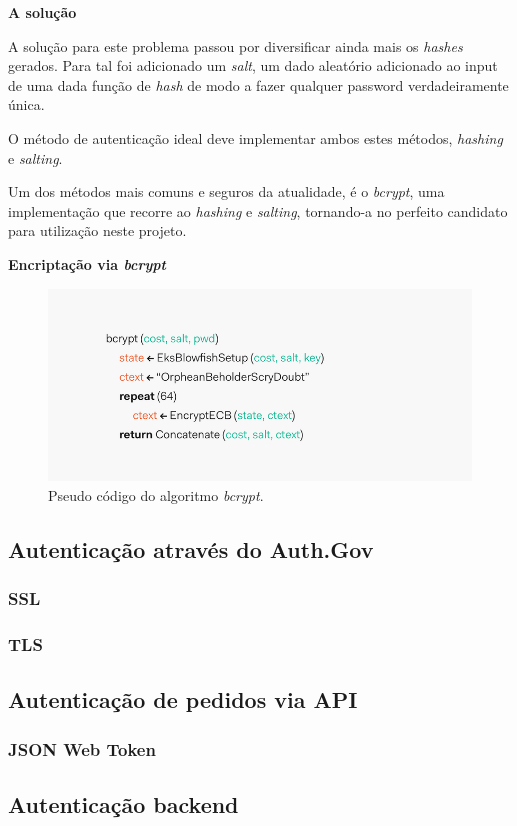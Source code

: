 \cleardoublepage
\large{\textbf{A solução}}


A solução para este problema passou por diversificar ainda mais os \emph{hashes} gerados. Para tal foi adicionado um \emph{salt}, um dado aleatório adicionado ao input de uma dada função de \emph{hash} de modo a fazer qualquer password verdadeiramente única.

O método de autenticação ideal deve implementar ambos estes métodos, \emph{hashing} e \emph{salting}.

Um dos métodos mais comuns e seguros da atualidade, é o \emph{bcrypt}, uma implementação que recorre ao \emph{hashing} e \emph{salting}, tornando-a no perfeito candidato para utilização neste projeto.

\vspace{0.5cm}
\large{\textbf{Encriptação via \emph{bcrypt}}}

\cleardoublepage

\begin{figure}[h]
    \centering
    \includegraphics[width=1\textwidth]{img/bcrypt/bcrypt-algo.png}
    \caption{Pseudo código do algoritmo \emph{bcrypt}.}
\end{figure}

\subsection{Autenticação através do Auth.Gov}

\subsubsection{SSL}
\subsubsection{TLS}


\subsection{Autenticação de pedidos via API}
\subsubsection{JSON Web Token}


\subsection{Autenticação backend}